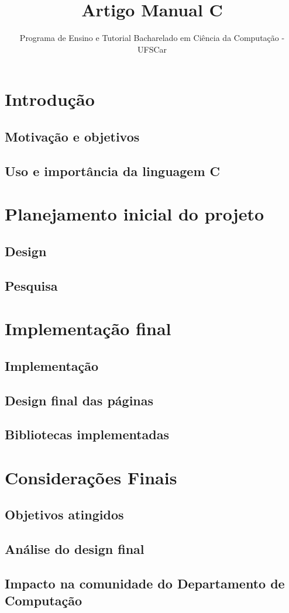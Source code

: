 \documentclass{article}
\title{\Large{\textbf{Artigo Manual C}}}
\author{Programa de Ensino e Tutorial Bacharelado em Ciência da Computação - UFSCar}
\begin{document}
\maketitle

\section{Introdução}
\subsection{Motivação e objetivos}
\subsection{Uso e importância da linguagem C}

\section{Planejamento inicial do projeto}
\subsection{Design}
\subsection{Pesquisa}

\section{Implementação final}
\subsection{Implementação}
\subsection{Design final das páginas}
\subsection{Bibliotecas implementadas}

\section{Considerações Finais}
\subsection{Objetivos atingidos}
\subsection{Análise do design final}
\subsection{Impacto na comunidade do Departamento de Computação}
\end{document}
